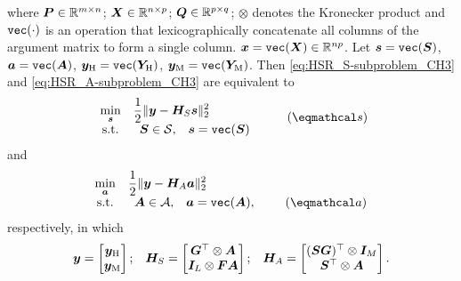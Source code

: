 where $\bm P \in \mathbb R^{m \times n}$; $\bm X \in \mathbb R^{n \times p}$;
$\bm Q \in \mathbb R^{p \times q}$; $\otimes$ denotes the Kronecker product and
$\texttt{vec}{(\cdot)}$ is an operation that lexicographically concatenate all
columns of the argument matrix to form a single column.
\ie $\bm x = \texttt{vec}{(\bm X)} \in \mathbb R^{np}$.
Let $\bm s=\texttt{vec}{(\bm S)}$, $\bm a=\texttt{vec}{(\bm A)}$, $\bm y_\text H=\texttt{vec}{(\bm Y_\text H)}$,
$\bm y_\text M=\texttt{vec}{(\bm Y_\text M)}$.
Then \eqref{eq:HSR_S-subproblem_CH3} and \eqref{eq:HSR_A-subproblem_CH3}
are equivalent to
\begin{equation}
    \begin{array}{cl}
        \underset{\bm s}{\min} &
        \displaystyle
        \frac{1}{2} \Vert \bm y - \bm H_S \bm s \Vert_2^2
        \\%
        \text{s.t.} &
        \begin{array}{cc}
            \bm S \in \mathcal S, & \bm s = \vectxt{\bm S}
        \end{array}
    \end{array} \tag{$\eqmathcal s$}
    \label{eq:HSR_s-subproblem}
\end{equation}
and
\begin{equation}
    \begin{array}{cl}
        \underset{\bm a}{\min} &
        \displaystyle
        \frac{1}{2} \Vert \bm y - \bm H_A \bm a \Vert_2^2
        \\%
        \text{s.t.} &
        \begin{array}{cc}
            \bm A \in \mathcal A, & \bm a = \vectxt{\bm A},
        \end{array} \tag{$\eqmathcal a$}
    \end{array}
    \label{eq:HSR_a-subproblem}
\end{equation}
respectively, in which
\[ \bm y   = \begin{bmatrix} \bm y_\text H \\ \bm y_\text M \end{bmatrix}; \;\;\;
   \bm H_S = \begin{bmatrix} \bm G^\top \otimes \bm A \\
                             \bm I_L  \otimes \bm{FA} \end{bmatrix}; \;\;\;
   \bm H_A = \begin{bmatrix} (\bm{SG})^\top \otimes \bm I_M \\
                                 \bm S^\top    \otimes \bm A \end{bmatrix}.\]
